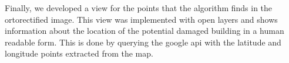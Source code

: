 \begin{figure}[h]
  \begin{center}
  \end{center}
\end{figure}
Finally, we developed a view for the points that the algorithm finds in the ortorectified image. This view was implemented with open layers and shows information about the location of the potential damaged building in a human readable form. This is done by querying the google api with the latitude and longitude points extracted from the map.

\begin{figure}[h]
  \begin{center}
  \end{center}
\end{figure}

